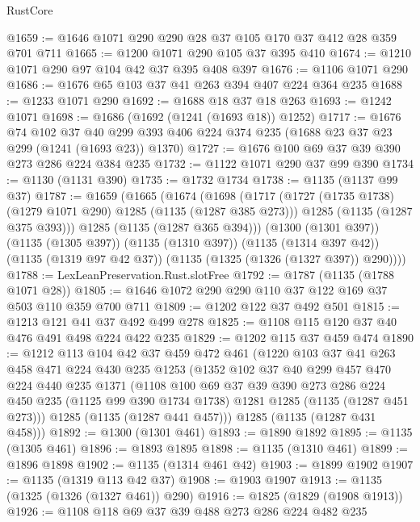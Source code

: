 \begin{lexlean}{RustCore}
\begin{coremodule}
@1659 := @1646 @1071 @290 @290 @28 @37 @105 @170 @37 @412 @28 @359 @701 @711
@1665 := @1200 @1071 @290 @105 @37 @395 @410
@1674 := @1210 @1071 @290 @97 @104 @42 @37 @395 @408 @397
@1676 := @1106 @1071 @290
@1686 := @1676 @65 @103 @37 @41 @263 @394 @407 @224 @364 @235
@1688 := @1233 @1071 @290
@1692 := @1688 @18 @37 @18 @263
@1693 := @1242 @1071
@1698 := @1686 (@1692 (@1241 (@1693 @18)) @1252)
@1717 := @1676
    @74
    @102
    @37
    @40
    @299
    @393
    @406
    @224
    @374
    @235
    (@1688 @23 @37 @23 @299 (@1241 (@1693 @23)) @1370)
@1727 := @1676 @100 @69 @37 @39 @390 @273 @286 @224 @384 @235
@1732 := @1122 @1071 @290 @37 @99 @390
@1734 := @1130 (@1131 @390)
@1735 := @1732 @1734
@1738 := @1135 (@1137 @99 @37)
@1787 := @1659
    (@1665
      (@1674
        (@1698
          (@1717
            (@1727 (@1735 @1738) (@1279 @1071 @290) @1285 (@1135 (@1287 @385 @273)))
            @1285
            (@1135 (@1287 @375 @393)))
          @1285
          (@1135 (@1287 @365 @394)))
        (@1300 (@1301 @397))
        (@1135 (@1305 @397))
        (@1135 (@1310 @397))
        (@1135 (@1314 @397 @42))
        (@1135 (@1319 @97 @42 @37))
        (@1135 (@1325 (@1326 (@1327 @397)) @290))))
@1788 := LexLeanPreservation.Rust.slotFree
@1792 := @1787 (@1135 (@1788 @1071 @28))
@1805 := @1646 @1072 @290 @290 @110 @37 @122 @169 @37 @503 @110 @359 @700 @711
@1809 := @1202 @122 @37 @492 @501
@1815 := @1213 @121 @41 @37 @492 @499 @278
@1825 := @1108 @115 @120 @37 @40 @476 @491 @498 @224 @422 @235
@1829 := @1202 @115 @37 @459 @474
@1890 := @1212
    @113
    @104
    @42
    @37
    @459
    @472
    @461
    (@1220
      @103
      @37
      @41
      @263
      @458
      @471
      @224
      @430
      @235
      @1253
      (@1352
        @102
        @37
        @40
        @299
        @457
        @470
        @224
        @440
        @235
        @1371
        (@1108
          @100
          @69
          @37
          @39
          @390
          @273
          @286
          @224
          @450
          @235
          (@1125 @99 @390 @1734 @1738)
          @1281
          @1285
          (@1135 (@1287 @451 @273)))
        @1285
        (@1135 (@1287 @441 @457)))
      @1285
      (@1135 (@1287 @431 @458)))
@1892 := @1300 (@1301 @461)
@1893 := @1890 @1892
@1895 := @1135 (@1305 @461)
@1896 := @1893 @1895
@1898 := @1135 (@1310 @461)
@1899 := @1896 @1898
@1902 := @1135 (@1314 @461 @42)
@1903 := @1899 @1902
@1907 := @1135 (@1319 @113 @42 @37)
@1908 := @1903 @1907
@1913 := @1135 (@1325 (@1326 (@1327 @461)) @290)
@1916 := @1825 (@1829 (@1908 @1913))
@1926 := @1108 @118 @69 @37 @39 @488 @273 @286 @224 @482 @235

\end{coremodule}
\end{lexlean}

